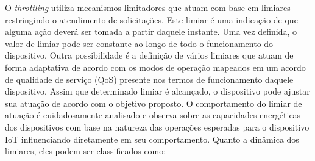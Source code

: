 O \textit{throttling} utiliza mecanismos limitadores que atuam com base em limiares restringindo o atendimento de solicitações. Este limiar é uma indicação de que alguma ação deverá ser tomada a partir daquele instante. Uma vez definida, o valor de limiar pode ser constante ao longo de todo o funcionamento do dispositivo. Outra possibilidade é a definição de vários limiares que atuam de forma adaptativa de acordo com os modos de operação mapeados em um acordo de qualidade de serviço (\ac{QoS}) presente nos termos de funcionamento daquele dispositivo. Assim que determinado limiar é alcançado, o dispositivo pode ajustar sua atuação de acordo com o objetivo proposto. O comportamento do limiar de atuação é cuidadosamente analisado e observa sobre as capacidades energéticas dos dispositivos com base na natureza das operações esperadas para o dispositivo \acs{IoT} influenciando diretamente em seu comportamento. Quanto a dinâmica dos limiares, eles podem ser classificados como:

